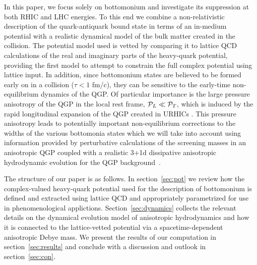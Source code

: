 In this paper, we focus solely on bottomonium and investigate its suppression at both RHIC and LHC energies. To this end we combine a non-relativistic description of the quark-antiquark bound state in terms of an in-medium potential with a realistic dynamical model of the bulk matter created in the collision.   The potential model used is vetted by comparing it to lattice QCD calculations of the real and imaginary parts of the heavy-quark potential, providing the first model to attempt to constrain the full complex potential using lattice input.  In addition, since bottomonium states are believed to be formed early on in a collision ($\tau < 1$ fm/c), they can be sensitive to the early-time non-equilibrium dynamics of the QGP.  Of particular importance is the large pressure anisotropy of the QGP in the local rest frame, ${\cal P}_L \ll {\cal P}_T$, which is induced by the rapid longitudinal expansion of the QGP created in URHICs \cite{Ryblewski:2013jsa,Strickland:2014pga}.  This pressure anisotropy leads to potentially important non-equilibrium corrections to the widths of the various bottomonia states \cite{Dumitru:2007hy,Burnier:2009yu,Dumitru:2009fy,Strickland:2011mw,Strickland:2011aa,Krouppa:2015yoa,Du:2016wdx,Krouppa:2016jcl,Du:2016wdx,Biondini:2017qjh,Krouppa:2017lsw,Nopoush:2017zbu} which we will take into account using information provided by perturbative calculations of the screening masses in an anisotropic QGP \cite{Romatschke:2003ms,Dumitru:2007hy,Dumitru:2009fy,Strickland:2011aa,Nopoush:2017zbu} coupled with a realistic 3+1d dissipative anisotropic hydrodynamic evolution for the QGP background~\cite{Martinez:2010sc,Florkowski:2010cf,Nopoush:2014pfa,Alqahtani:2015qja,Alqahtani:2016rth,Alqahtani:2017jwl,Alqahtani:2017tnq}.  

The structure of our paper is as follows.  In section~\ref{sec:pot} we review how the complex-valued heavy-quark potential used for the description of bottomonium is defined and extracted using lattice QCD and appropriately parametrized for use in phenomenological applictions. Section~\ref{sec:dynamics} collects the relevant details on the dynamical evolution model of anisotropic hydrodynamics and how it is connected to the lattice-vetted potential via a spacetime-dependent anisotropic Debye mass. We present the results of our computation in section~\ref{sec:results} and conclude with a discussion and outlook in section~\ref{sec:con}.